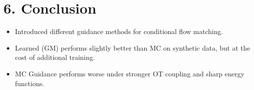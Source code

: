 \documentclass[11pt,a4paper]{article}
\begin{document}
\section*{6. Conclusion}
\begin{itemize}[leftmargin=*, nosep]
    \item Introduced different guidance methods for conditional flow matching.
    \item Learned (GM) performs slightly better than MC on synthetic data, but at the cost of additional training.
    \item MC Guidance performs worse under stronger OT coupling and sharp energy functions.
\end{itemize}
\end{document}
